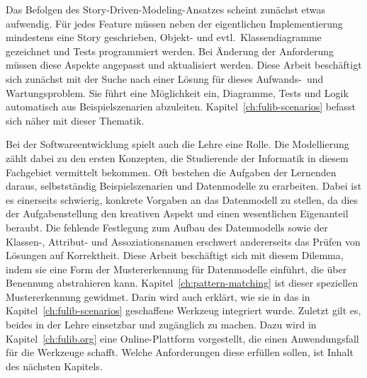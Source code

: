 Das Befolgen des Story-Driven-Modeling-Ansatzes scheint zunächst etwas aufwendig.
Für jedes Feature müssen neben der eigentlichen Implementierung mindestens eine Story geschrieben, Objekt- und evtl.\ Klassendiagramme gezeichnet und Tests programmiert werden.
Bei Änderung der Anforderung müssen diese Aspekte angepasst und aktualisiert werden.
Diese Arbeit beschäftigt sich zunächst mit der Suche nach einer Lösung für dieses Aufwands-\ und Wartungsproblem.
Sie führt eine Möglichkeit ein, Diagramme, Tests und Logik automatisch aus Beispielszenarien abzuleiten.
Kapitel~\ref{ch:fulib-scenarios} befasst sich näher mit dieser Thematik.

Bei der Softwareentwicklung spielt auch die Lehre eine Rolle.
Die Modellierung zählt dabei zu den ersten Konzepten, die Studierende der Informatik in diesem Fachgebiet vermittelt bekommen.
Oft bestehen die Aufgaben der Lernenden daraus, selbstständig Beispielszenarien und Datenmodelle zu erarbeiten.
Dabei ist es einerseits schwierig, konkrete Vorgaben an das Datenmodell zu stellen, da dies der Aufgabenstellung den kreativen Aspekt und einen wesentlichen Eigenanteil beraubt.
Die fehlende Festlegung zum Aufbau des Datenmodells sowie der Klassen-, Attribut- und Assoziationsnamen erschwert andererseits das Prüfen von Lösungen auf Korrektheit.
Diese Arbeit beschäftigt sich mit diesem Dilemma, indem sie eine Form der Mustererkennung für Datenmodelle einführt, die über Benennung abstrahieren kann.
Kapitel~\ref{ch:pattern-matching} ist dieser speziellen Mustererkennung gewidmet.
Darin wird auch erklärt, wie sie in das in Kapitel~\ref{ch:fulib-scenarios} geschaffene Werkzeug integriert wurde.
Zuletzt gilt es, beides in der Lehre einsetzbar und zugänglich zu machen.
Dazu wird in Kapitel~\ref{ch:fulib.org} eine Online-Plattform vorgestellt, die einen Anwendungsfall für die Werkzeuge schafft.
Welche Anforderungen diese erfüllen sollen, ist Inhalt des nächsten Kapitels.
